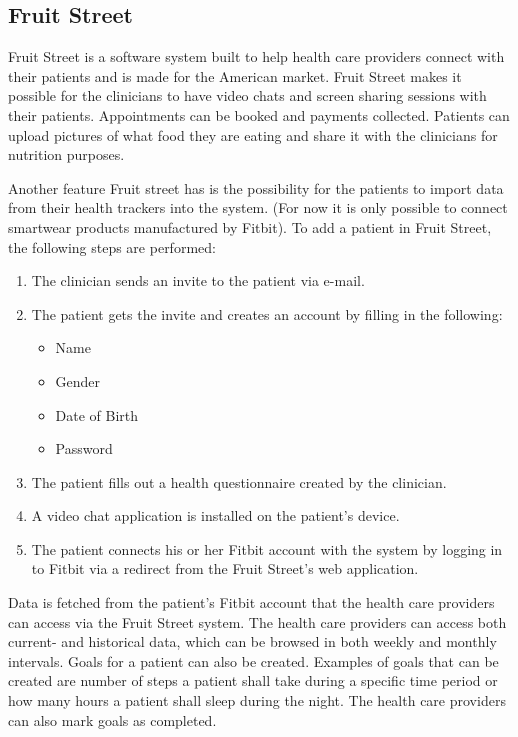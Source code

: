 \documentclass{cslthse-msc}
\begin{document}


\subsection{Fruit Street}

Fruit Street is a software system built to help health care providers connect with their patients and is made for the American market. Fruit Street makes it possible for the clinicians to have video chats and screen sharing sessions with their patients. Appointments can be booked and payments collected. Patients can upload pictures of what food they are eating and share it with the clinicians for nutrition purposes. 

Another feature Fruit street has is the possibility for the patients to import data from their health trackers\cite{FruitStreet} into the system. (For now it is only possible to connect smartwear products manufactured by Fitbit). To add a patient in Fruit Street, the following steps are performed:

\begin{enumerate}
    \item The clinician sends an invite to the patient via e-mail.
    \item The patient gets the invite and creates an account by filling in the following:
\begin{itemize}
    \item Name
    \item Gender
    \item Date of Birth
    \item Password
\end{itemize}
    \item The patient fills out a health questionnaire created by the clinician.
    \item A video chat application is installed on the patient’s device.
    \item The patient connects his or her Fitbit account with the system by logging in to Fitbit via a redirect from the Fruit Street's web application.
\end{enumerate}

Data is fetched from the patient's Fitbit account that the health care providers can access via the Fruit Street system. The health care providers can access both current- and historical data, which can be browsed in both weekly and monthly intervals. Goals for a patient can also be created. Examples of goals that can be created are number of steps a patient shall take during a specific time period or how many hours a patient shall sleep during the night. The health care providers can also mark goals as completed. 
\end{document}
